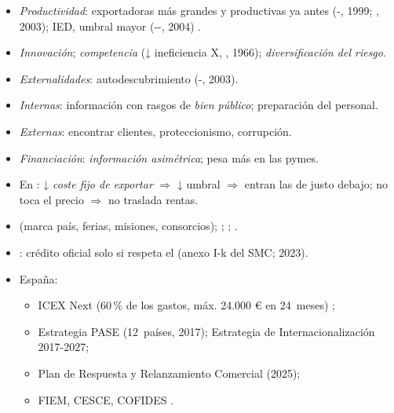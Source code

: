 \documentclass{article}
\begin{document}
\begin{columnas}
\begin{itemize}
\item \emph{Productividad}: exportadoras más grandes y productivas ya antes (-, 1999; , 2003); IED, umbral mayor (--, 2004) .
\item \emph{Innovación}; \emph{competencia} (↓ ineficiencia X, , 1966); \emph{diversificación del riesgo}.
\item \emph{Externalidades}: autodescubrimiento (-, 2003).
\end{itemize}
\begin{itemize}
\item \emph{Internas}: información con rasgos de \emph{bien público}; preparación del personal.
\item \emph{Externas}: encontrar clientes, proteccionismo, corrupción.
\item \emph{Financiación}: \emph{información asimétrica}; pesa más en las pymes.
\item En : ↓ \emph{coste fijo de exportar} $\Rightarrow$ ↓ umbral $\Rightarrow$ entran las de justo debajo; no toca el precio $\Rightarrow$ no traslada rentas.
\end{itemize}

\begin{itemize}
\item {} (marca país, ferias, misiones, consorcios); ; ; .
\item {}: crédito oficial solo si respeta el  (anexo I-k del SMC; 2023).
\item España:
  \begin{itemize}
  \item ICEX Next (60\,\% de los gastos, máx. 24.000 € en 24~meses) ;
  \item Estrategia PASE (12~países, 2017); Estrategia de Internacionalización 2017-2027;
  \item Plan de Respuesta y Relanzamiento Comercial (2025);
  \item FIEM, CESCE, COFIDES .
  \end{itemize}
\end{itemize}


\end{columnas}
\end{document}
